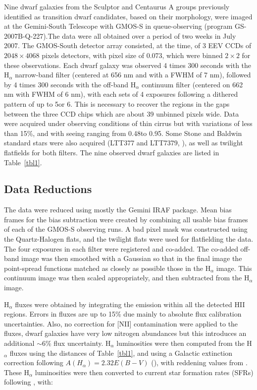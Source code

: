 \documentclass[12pt,preprint]{emulateapj}
\begin{document}
Nine dwarf galaxies from the Sculptor and Centaurus A groups previously identified as transition dwarf candidates, based on their morphology,  were 
imaged at the Gemini-South Telescope with GMOS-S in queue-observing (program GS-2007B-Q-227).The data were all obtained over a period of two 
weeks in July 2007. The GMOS-South detector array consisted, at the time, of 3 EEV CCDs of $2048\times 4068$ pixels detectors, with pixel size of 
0.073\arcsec, which were binned $2\times 2$ for these observations. Each dwarf galaxy was observed 4 times 300 seconds with the H$_\alpha$ 
narrow-band filter (centered at 656 nm and with a FWHM of 7 nm), followed by 4 times 300 seconds with the off-band H$_\alpha$ continuum filter (centered on 662 nm with FWHM of 6 nm), with each sets of 4 exposures 
following a dithered pattern of up to 5\arcsec or 6\arcsec. This is necessary to recover the regions in the gaps between the three CCD chips which are 
about 39 unbinned pixels wide. Data were acquired under observing conditions of thin cirrus but with variations of less than 15\%, and with seeing
ranging from 0.48\arcsec to 0.95\arcsec. Some Stone and Baldwin standard stars were also acquired (LTT377 and LTT7379, \cite{sb83}), as well as 
twilight flatfields for both filters. The nine observed dwarf galaxies are listed in Table~\ref{tbl1}.

\subsection{Data Reductions}

The data were reduced using mostly the Gemini IRAF package. Mean bias frames for the bias subtraction were created by combining all usable bias 
frames of each of the GMOS-S observing runs. A bad pixel mask was constructed using the Quartz-Halogen flats, and the twilight flats were used for 
flatfielding the data. The four exposures in each filter were registered and co-added. The co-added off-band image was then smoothed with a Gaussian 
so that in the final image the point-spread functions matched as closely as possible those in the H$_\alpha$ image. This continuum image was then scaled 
appropriately, and then subtracted from the H$_\alpha$ image. 

H$_\alpha$ fluxes were obtained by integrating the emission within all the detected HII regions. Errors in fluxes are up to 15\% due mainly to absolute 
flux calibration uncertainties. Also, no correction for [NII] contamination were applied to the fluxes, dwarf galaxies have very low nitrogen abundances
\cite[see, e.g.,][]{scm03b} but this introduces an additional $\sim $6\% flux uncertainty. H$_\alpha$ luminosities were then computed from the H$_\alpha$ 
fluxes using the distances of Table~\ref{tbl1}, and using a Galactic extinction correction following $A(H_\alpha ) = 2.32 E(B-V)$ (\cite{mh94}), with reddening values 
from \cite{sfd98}. These H$_\alpha$ luminosities were then converted to current star formation rates (SFRs) following \cite{ktc94}, with:
\end{document}

